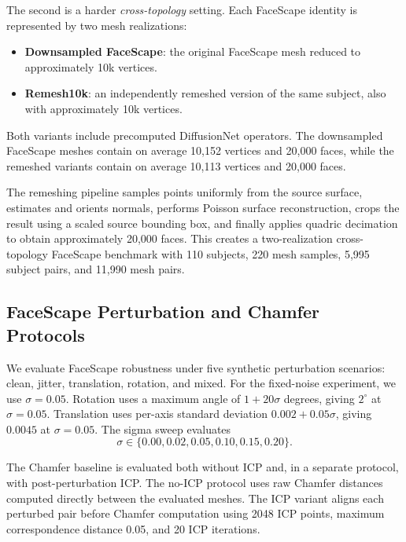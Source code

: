 \documentclass[10pt,twocolumn,letterpaper]{article}
\begin{document}
The second is a harder \emph{cross-topology} setting. Each FaceScape identity is
represented by two mesh realizations:
\begin{itemize}
    \item \textbf{Downsampled FaceScape}: the original FaceScape mesh reduced to
    approximately 10k vertices.
    \item \textbf{Remesh10k}: an independently remeshed version of the same
    subject, also with approximately 10k vertices.
\end{itemize}
Both variants include precomputed DiffusionNet operators. The downsampled
FaceScape meshes contain on average 10,152 vertices and 20,000 faces, while the
remeshed variants contain on average 10,113 vertices and 20,000 faces.

The remeshing pipeline samples points uniformly from the source surface,
estimates and orients normals, performs Poisson surface reconstruction, crops the
result using a scaled source bounding box, and finally applies quadric decimation
to obtain approximately 20,000 faces. This creates a two-realization
cross-topology FaceScape benchmark with 110 subjects, 220 mesh samples, 5,995
subject pairs, and 11,990 mesh pairs.

\subsection{FaceScape Perturbation and Chamfer Protocols}
\label{app:faceverse_perturbation_protocol}

We evaluate FaceScape robustness under five synthetic perturbation scenarios:
clean, jitter, translation, rotation, and mixed. For the fixed-noise experiment,
we use $\sigma=0.05$. Rotation uses a maximum angle of $1+20\sigma$ degrees,
giving $2^\circ$ at $\sigma=0.05$. Translation uses per-axis standard deviation
$0.002+0.05\sigma$, giving $0.0045$ at $\sigma=0.05$. The sigma sweep evaluates
\begin{equation}
\sigma \in \{0.00, 0.02, 0.05, 0.10, 0.15, 0.20\}.
\label{eq:faceverse_sigma_sweep}
\end{equation}

The Chamfer baseline is evaluated both without ICP and, in a separate protocol,
with post-perturbation ICP. The no-ICP protocol uses raw Chamfer distances
computed directly between the evaluated meshes. The ICP variant aligns each
perturbed pair before Chamfer computation using 2048 ICP points, maximum
correspondence distance 0.05, and 20 ICP iterations.
\end{document}
